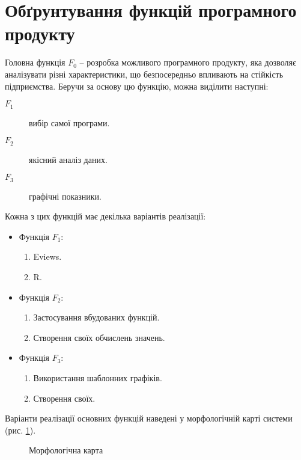 \documentclass[../diploma]{subfiles}
\begin{document}
\section{Обґрунтування функцій програмного продукту}

Головна функція $F_0$ -- розробка можливого програмного продукту, яка дозволяє аналізувати різні характеристики, що безпосередньо впливають на стійкість підприємства.  Беручи за основу цю функцію, можна виділити наступні:
\begin{description}
\item[$F_1$] вибір самої програми.
\item[$F_2$] якісний аналіз даних.
\item[$F_3$] графічні показники.
\end{description}

Кожна з цих функцій має декілька варіантів реалізації:

\begin{itemize}[label={}]
\item Функція $F_1$:
	\begin{enumerate}[label=\alph*)]
	\item Eviews.
	\item R.
	\end{enumerate}
\item Функція $F_2$:
	\begin{enumerate}[label=\alph*)]
	\item Застосування вбудованих функцій.
	\item Створення своїх обчислень значень.
	\end{enumerate}
\item Функція $F_3$:
	\begin{enumerate}[label=\alph*)]
	\item Використання шаблонних графіків.
	\item Створення своїх.
	\end{enumerate}
\end{itemize}

Варіанти реалізації основних функцій  наведені у  морфологічній карті системи (рис. \ref{fig:morph_map}).

\begin{figure}[H]
\centering
\end{figure}
\begin{figure}[H]
\centering
{}
\vspace{1ex}\caption{Морфологічна карта}\label{fig:morph_map}
\end{figure}
\end{document}
